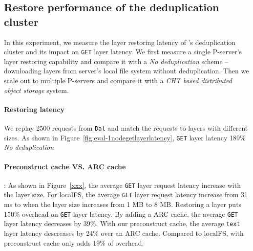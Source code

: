 

\subsection{Restore performance of the deduplication cluster}
\label{sec:eval-dedup}




In this experiment,
we measure the layer restoring latency of \sysname's deduplication cluster
and its impact on \texttt{GET} layer latency.
We first measure a single P-server's layer restoring capability
and compare it with a \emph{No deduplication} scheme --
downloading layers from server's local file system without deduplication.
Then we scale out to multiple P-servers
and compare it with a \emph{CHT based distributed object storage} system.
%
%

\paragraph{Restoring latency}

We replay 2500 requests from \texttt{Dal}
and match the requests to layers with different sizes.
As shown in Figure~\ref{fig:eval-1nodegetlayerlatency},
\texttt{GET} layer latency 189\%
\emph{No deduplication} 

\paragraph{Preconstruct cache VS. ARC cache}:
As shown in Figure~\ref{xxx}, the average \texttt{GET} layer request latency increase with the layer size.
For localFS, the average \texttt{GET} layer request latency increase from 31 ms to 
when the layer size increases from 1 MB to 8 MB.
Restoring a layer puts 150\% overhead on \texttt{GET} layer latency.
By adding a ARC cache,
the average \texttt{GET} layer latency decreases by 39\%.
With our preconstruct cache,
the average \texttt{text} layer latency descreases by 24\% over an ARC cache.
Compared to localFS, \sysname with preconstruct cache only adds 19\% of overhead. 


